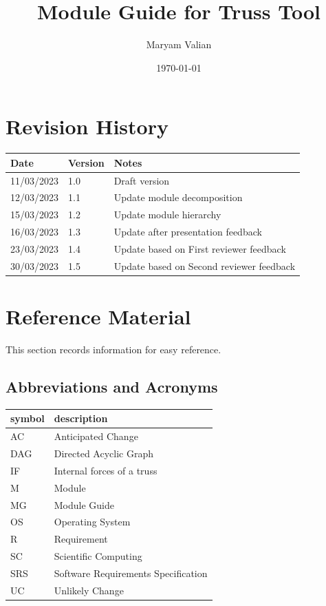 \documentclass[12pt, titlepage]{article}
\begin{document}
\title{Module Guide for Truss Tool} 
\author{Maryam Valian}
\date{\today}

\maketitle


\section{Revision History}

\begin{tabularx}{\textwidth}{p{3cm}p{2cm}X}
\toprule {\bf Date} & {\bf Version} & {\bf Notes}\\
\midrule
11/03/2023 & 1.0 & Draft version\\
12/03/2023 & 1.1 & Update module decomposition\\
15/03/2023 &1.2 & Update module hierarchy\\
16/03/2023 &1.3 & Update after presentation feedback\\
23/03/2023 &1.4 & Update based on First reviewer feedback\\
30/03/2023 &1.5 & Update based on Second reviewer feedback\\
\bottomrule
\end{tabularx}

\newpage

\section{Reference Material}

This section records information for easy reference.

\subsection{Abbreviations and Acronyms}

\renewcommand{\arraystretch}{1.2}
\begin{tabular}{l l} 
  \toprule		
  \textbf{symbol} & \textbf{description}\\
  \midrule 
  AC & Anticipated Change\\
  DAG & Directed Acyclic Graph \\
  IF & Internal forces of a truss\\
  M & Module \\
  MG & Module Guide \\
  OS & Operating System \\
  R & Requirement\\
  SC & Scientific Computing \\
  SRS & Software Requirements Specification\\
  
  UC & Unlikely Change \\
  
  \bottomrule
\end{tabular}\\
\end{document}
